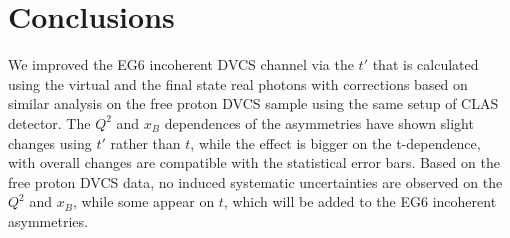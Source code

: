 \documentclass[a4paper,11pt,twoside]{article}
\begin{document}
\section{Conclusions}
We improved the EG6 incoherent DVCS channel via the $t'$ that is calculated 
using the virtual and the final state real photons with corrections based on 
similar analysis on the free proton DVCS sample using the same setup of CLAS 
detector. The $Q^{2}$ and $x_B$ dependences of the asymmetries have shown 
slight changes using $t'$ rather than $t$, while the effect is bigger on the 
t-dependence, with overall changes are compatible with the statistical error 
bars.  Based on the free proton DVCS data, no induced systematic uncertainties 
are observed on the $Q^{2}$ and $x_B$, while some appear on $t$, which will be 
added to the EG6 incoherent asymmetries.
\end{document}
